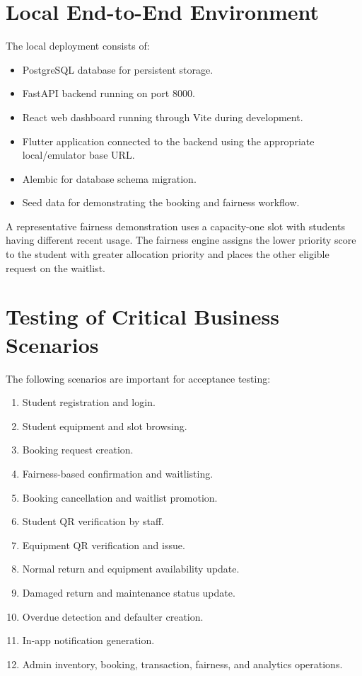 \documentclass[12pt,a4paper,oneside]{report}
\begin{document}
\section{Local End-to-End Environment}

The local deployment consists of:

\begin{itemize}
    \item PostgreSQL database for persistent storage.
    \item FastAPI backend running on port 8000.
    \item React web dashboard running through Vite during development.
    \item Flutter application connected to the backend using the appropriate local/emulator base URL.
    \item Alembic for database schema migration.
    \item Seed data for demonstrating the booking and fairness workflow.
\end{itemize}

A representative fairness demonstration uses a capacity-one slot with students having different recent usage. The fairness engine assigns the lower priority score to the student with greater allocation priority and places the other eligible request on the waitlist.

\section{Testing of Critical Business Scenarios}

The following scenarios are important for acceptance testing:

\begin{enumerate}
    \item Student registration and login.
    \item Student equipment and slot browsing.
    \item Booking request creation.
    \item Fairness-based confirmation and waitlisting.
    \item Booking cancellation and waitlist promotion.
    \item Student QR verification by staff.
    \item Equipment QR verification and issue.
    \item Normal return and equipment availability update.
    \item Damaged return and maintenance status update.
    \item Overdue detection and defaulter creation.
    \item In-app notification generation.
    \item Admin inventory, booking, transaction, fairness, and analytics operations.
\end{enumerate}
\end{document}
